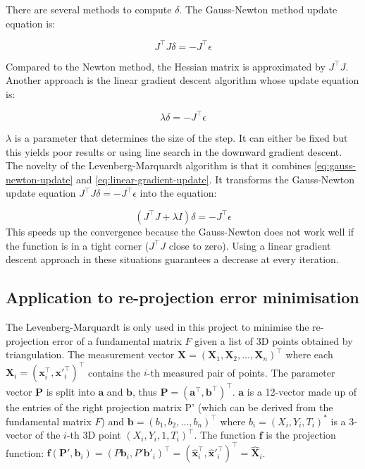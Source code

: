 \documentclass[11pt]{report}
\begin{document}
There are several methods to compute $\delta$. The Gauss-Newton method update equation is: 

\begin{equation}
  \label{eq:gauss-newton-update}
  J^\top J\delta = -J^\top \epsilon
\end{equation}

Compared to the Newton method, the Hessian matrix is approximated by $J^\top J$. Another approach is the linear gradient descent algorithm whose update equation is:

\begin{equation}
  \label{eq:linear-gradient-update}
 \lambda \delta = -J^\top \epsilon
\end{equation}

$\lambda$ is a parameter that determines the size of the step. It can either be fixed but this yields poor results or using line search in the downward gradient descent. The novelty of the Levenberg-Marquardt algorithm is that it combines \ref{eq:gauss-newton-update} and \ref{eq:linear-gradient-update}. It transforms the Gauss-Newton update equation $J^\top J\delta = -J^\top \epsilon$ into the equation:

\begin{equation}
  \label{eq:lm_update}
  (J^\top J + \lambda I)\delta = -J^\top \epsilon
\end{equation}
 This speeds up the convergence because the Gauss-Newton does not work well if the function is in a tight corner ($J^\top J$ close to zero). Using a linear gradient descent approach in these situations guarantees a decrease at every iteration.


\subsection{Application to re-projection error minimisation}

The Levenberg-Marquardt is only used in this project to minimise the re-projection error of a fundamental matrix $F$ given a list of 3D points obtained by triangulation. The measurement vector $\mathbf{X} = (\mathbf{X}_1, \mathbf{X}_2, \hdots, \mathbf{X}_n)^\top$ where each $\mathbf{X}_i = (\mathbf{x}_i^\top, \mathbf{x}'^\top_i)^\top$ contains the $i$-th measured pair of points.
The parameter vector $\mathbf{P}$ is split into $\mathbf{a}$ and $\mathbf{b}$, thus $\mathbf{P}=(\mathbf{a}^\top, \mathbf{b}^\top)^\top$. $\mathbf{a}$ is a 12-vector made up of the entries of the right projection matrix P' (which can be derived from the fundamental matrix $F$) and $\mathbf{b}=(b_1, b_2, \hdots, b_n)^\top$ where $b_i = (X_i, Y_i, T_i)^\ast$ is a 3-vector of the $i$-th 3D point $(X_i, Y_i, 1, T_i)^\top$. The function $\mathbf{f}$ is the projection function: $\mathbf{f}(\mathbf{P}', \mathbf{b}_i) = (P\mathbf{b}_i, P'\mathbf{b}'_i)^\top = (\widehat{\mathbf{x}}_i^\top, \widehat{\mathbf{x}}'^\top_i)^\top = \widehat{\mathbf{X}}_i$.
\end{document}
